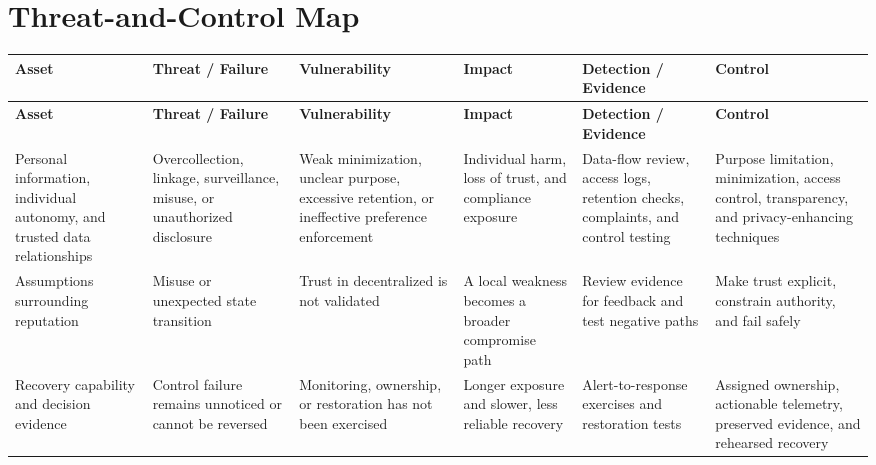 \documentclass[11pt]{article}
\begin{document}
\section*{Threat-and-Control Map}
\begingroup\scriptsize\setlength{\tabcolsep}{2pt}
\begin{longtable}{>{\RaggedRight\arraybackslash}p{}>{\RaggedRight\arraybackslash}p{}>{\RaggedRight\arraybackslash}p{}>{\RaggedRight\arraybackslash}p{}>{\RaggedRight\arraybackslash}p{}>{\RaggedRight\arraybackslash}p{}}
\toprule\rowcolor{Navy}\color{white}\textbf{Asset} & \color{white}\textbf{Threat / Failure} & \color{white}\textbf{Vulnerability} & \color{white}\textbf{Impact} & \color{white}\textbf{Detection / Evidence} & \color{white}\textbf{Control}\\\midrule
\endfirsthead
\toprule\rowcolor{Navy}\color{white}\textbf{Asset} & \color{white}\textbf{Threat / Failure} & \color{white}\textbf{Vulnerability} & \color{white}\textbf{Impact} & \color{white}\textbf{Detection / Evidence} & \color{white}\textbf{Control}\\\midrule
\endhead
Personal information, individual autonomy, and trusted data relationships & Overcollection, linkage, surveillance, misuse, or unauthorized disclosure & Weak minimization, unclear purpose, excessive retention, or ineffective preference enforcement & Individual harm, loss of trust, and compliance exposure & Data-flow review, access logs, retention checks, complaints, and control testing & Purpose limitation, minimization, access control, transparency, and privacy-enhancing techniques\\\midrule
Assumptions surrounding reputation & Misuse or unexpected state transition & Trust in decentralized is not validated & A local weakness becomes a broader compromise path & Review evidence for feedback and test negative paths & Make trust explicit, constrain authority, and fail safely\\\midrule
Recovery capability and decision evidence & Control failure remains unnoticed or cannot be reversed & Monitoring, ownership, or restoration has not been exercised & Longer exposure and slower, less reliable recovery & Alert-to-response exercises and restoration tests & Assigned ownership, actionable telemetry, preserved evidence, and rehearsed recovery\\\midrule
\bottomrule
\end{longtable}
\endgroup
\end{document}
